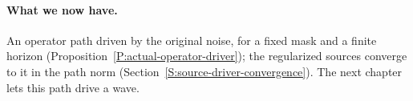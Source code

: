 \paragraph{What we now have.}
An operator path driven by the original noise, for a fixed mask and a finite
horizon (Proposition~\ref{P:actual-operator-driver}); the regularized sources
converge to it in the path norm (Section~\ref{S:source-driver-convergence}).
The next chapter lets this path drive a wave.
